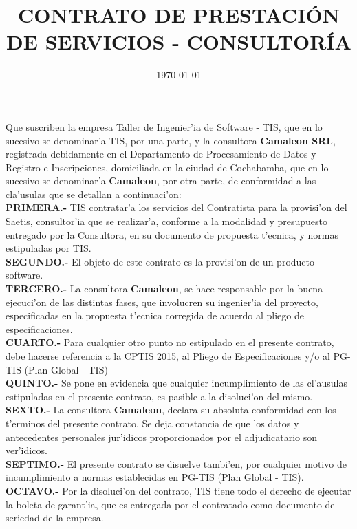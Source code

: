 \documentclass{article}
\newcommand{\sistema}[0]{Saetis}
\newcommand{\convocatoria}[0]{CPTIS 2015}
\newcommand{\empresa}[0]{\textbf{Camaleon}}
\newcommand{\empresaL}[0]{\textbf{Camaleon SRL}}
\begin{document}
\title{\bf{CONTRATO DE PRESTACI\'ON DE SERVICIOS - CONSULTOR\'IA}}
\date{\today}

\maketitle

Que suscriben la empresa Taller de Ingenier'ia de Software - TIS, que en lo sucesivo se denominar'a TIS, por una parte, y la consultora  \empresaL, registrada debidamente en el Departamento de Procesamiento de Datos y Registro e Inscripciones, domiciliada en la ciudad de Cochabamba, que en lo sucesivo se denominar'a \empresa, por otra parte, de conformidad a las cla'usulas que se detallan a continuaci'on:
\\
{\bf{PRIMERA.-}} TIS contratar'a los servicios del Contratista para la provisi'on del \sistema, consultor'ia que se realizar'a, conforme a la modalidad y  presupuesto entregado por la Consultora, en su documento de propuesta t'ecnica, y normas estipuladas por TIS.
\\
{\bf{SEGUNDO.-}} El objeto de este contrato  es la provisi'on de un producto software.
\\
{\bf{TERCERO.-}} La consultora \empresa,  se hace responsable por la buena ejecuci'on de las distintas fases, que involucren su ingenier'ia del proyecto, especificadas en la propuesta t'ecnica corregida de acuerdo al pliego de especificaciones.
\\
{\bf{CUARTO.-}} Para cualquier otro punto no estipulado en el presente contrato, debe hacerse referencia a la \convocatoria, al Pliego de Especificaciones y/o al PG-TIS (Plan Global - TIS)
\\
{\bf{QUINTO.-}} Se pone en evidencia que cualquier incumplimiento de las cl'ausulas estipuladas en el presente contrato, es pasible a la disoluci'on del mismo.
\\
{\bf{SEXTO.-}} La consultora \empresa,  declara su absoluta conformidad con los t'erminos del presente contrato. Se deja constancia de que los datos y antecedentes personales jur'idicos proporcionados por el adjudicatario son ver'idicos.
\\
{\bf{SEPTIMO.-}} El presente contrato se disuelve tambi'en, por cualquier motivo de incumplimiento a normas establecidas en PG-TIS (Plan Global - TIS).
\\
{\bf{OCTAVO.-}} Por la disoluci'on del contrato, TIS tiene todo el derecho de ejecutar la boleta de garant'ia, que es entregada por el contratado como documento de seriedad de la empresa.
\end{document}
